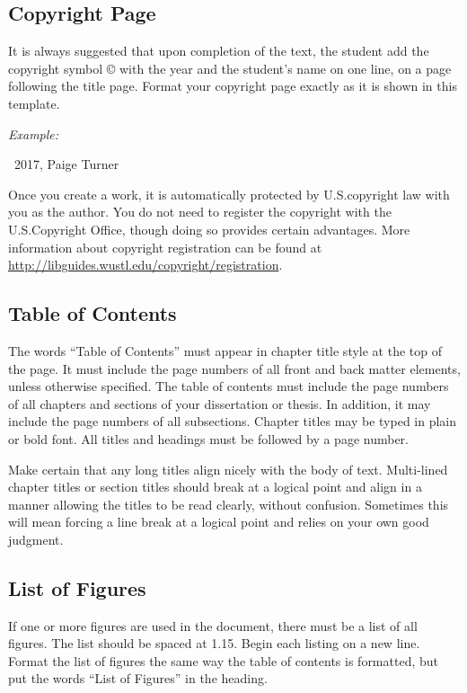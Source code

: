 \subsection{Copyright Page}

It is always suggested that upon completion of the text, the student add the copyright symbol © with the year and the student's name on one line, on a page following the title page.
Format your copyright page exactly as it is shown in this template.

\vspace{\onelineskip}
\noindent
\textit{Example:}

\centerline{\textcopyright\ 2017, Paige Turner}
\vspace{\onelineskip}

Once you create a work, it is automatically protected by U.S.\@ copyright law with you as the author.
You do not need to register the copyright with the U.S.\@ Copyright Office, though doing so provides certain advantages.
More information about copyright registration can be found at \href{http://libguides.wustl.edu/copyright/registration}{http://libguides.wustl.edu/copyright/registration}.

\subsection{Table of Contents}

The words ``Table of Contents'' must appear in chapter title style at the top of the page.
It must include the page numbers of all front and back matter elements, unless otherwise specified.
The table of contents must include the page numbers of all chapters and sections of your dissertation or thesis.
In addition, it may include the page numbers of all subsections.
Chapter titles may be typed in plain or bold font.
All titles and headings must be followed by a page number.

Make certain that any long titles align nicely with the body of text.
Multi-lined chapter titles or section titles should break at a logical point and align in a manner allowing the titles to be read clearly, without confusion.
Sometimes this will mean forcing a line break at a logical point and relies on your own good judgment.

\subsection{List of Figures}

If one or more figures are used in the document, there must be a list of all figures.
The list should be spaced at 1.15.
Begin each listing on a new line.
Format the list of figures the same way the table of contents is formatted, but put the words ``List of Figures'' in the heading.


